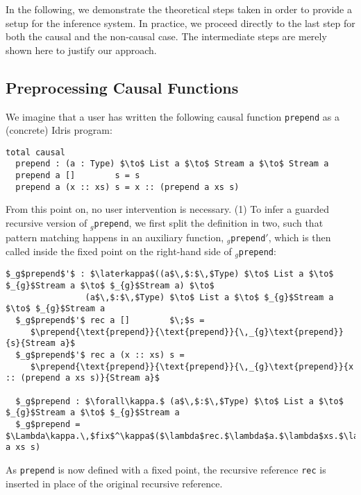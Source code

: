 In the following, we demonstrate the theoretical steps taken in order to provide
a setup for the inference system. In practice, we proceed directly to the last
step for both the causal and the non-causal case. The intermediate steps are
merely shown here to justify our approach.

\subsection{Preprocessing Causal Functions}
\label{sec:prepr-caus-funct}
 We imagine that a user has written the following causal function
 \texttt{prepend} as a (concrete) Idris program:
\begin{lstlisting}[mathescape, title=\idrisBlock]
  total causal
  prepend : (a : Type) $\to$ List a $\to$ Stream a $\to$ Stream a
  prepend a []        s = s
  prepend a (x :: xs) s = x :: (prepend a xs s)
\end{lstlisting}
 From this point on, no user intervention is necessary.  (1) To infer a guarded
 recursive version of \texttt{$_g$prepend}, we first split the definition in
 two, such that pattern matching happens in an auxiliary function,
 \texttt{$_g$prepend$'$}, which is then called inside the fixed point on the
 right-hand side of \texttt{$_g$prepend}:

\begin{lstlisting}[mathescape, title=\ttBlock]
  $_g$prepend$'$ : $\laterkappa$((a$\,$:$\,$Type) $\to$ List a $\to$ $_{g}$Stream a $\to$ $_{g}$Stream a) $\to$ 
                (a$\,$:$\,$Type) $\to$ List a $\to$ $_{g}$Stream a $\to$ $_{g}$Stream a
  $_g$prepend$'$ rec a []        $\;$s = 
     $\prepend{\text{prepend}}{\text{prepend}}{\,_{g}\text{prepend}}{s}{Stream a}$
  $_g$prepend$'$ rec a (x :: xs) s = 
     $\prepend{\text{prepend}}{\text{prepend}}{\,_{g}\text{prepend}}{x :: (prepend a xs s)}{Stream a}$

  $_g$prepend : $\forall\kappa.$ (a$\,$:$\,$Type) $\to$ List a $\to$ $_{g}$Stream a $\to$ $_{g}$Stream a
  $_g$prepend = $\Lambda\kappa.\,$fix$^\kappa$($\lambda$rec.$\lambda$a.$\lambda$xs.$\lambda$s.$\,$$_g$prepend$'\;$rec a xs s)
\end{lstlisting}
As \texttt{prepend} is now defined with a fixed point, the recursive reference
\texttt{rec} is inserted in place of the original recursive reference.

